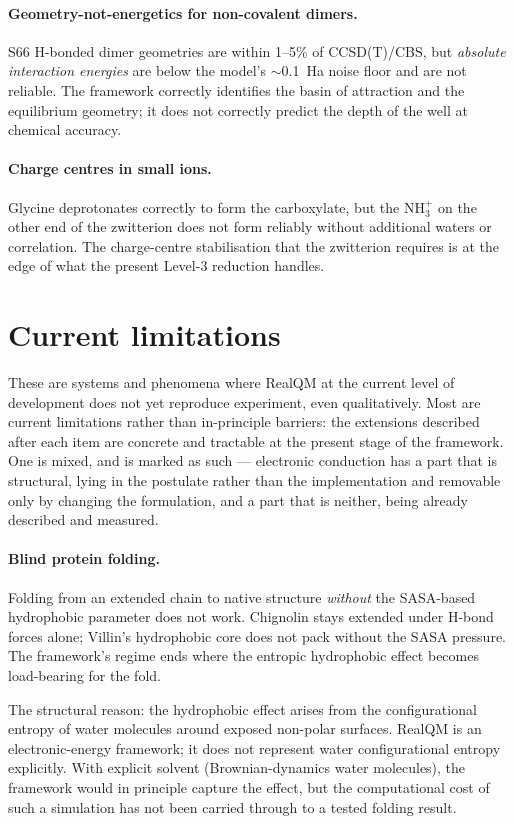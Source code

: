 \paragraph{Geometry-not-energetics for non-covalent dimers.}
S66 H-bonded dimer geometries are within 1--5\% of CCSD(T)/CBS, but \emph{absolute interaction energies} are below the model's $\sim$0.1~Ha noise floor and are not reliable. The framework correctly identifies the basin of attraction and the equilibrium geometry; it does not correctly predict the depth of the well at chemical accuracy.

\paragraph{Charge centres in small ions.}
Glycine deprotonates correctly to form the carboxylate, but the NH$_3^+$ on the other end of the zwitterion does not form reliably without additional waters or correlation. The charge-centre stabilisation that the zwitterion requires is at the edge of what the present Level-3 reduction handles.

\section{Current limitations}\label{sec:current-limitations}

These are systems and phenomena where RealQM at the current level of development does not yet reproduce experiment, even qualitatively. Most are current limitations rather than in-principle barriers: the extensions described after each item are concrete and tractable at the present stage of the framework. One is mixed, and is marked as such --- electronic conduction has a part that is structural, lying in the postulate rather than the implementation and removable only by changing the formulation, and a part that is neither, being already described and measured.

\paragraph{Blind protein folding.}
Folding from an extended chain to native structure \emph{without} the SASA-based hydrophobic parameter does not work. Chignolin stays extended under H-bond forces alone; Villin's hydrophobic core does not pack without the SASA pressure. The framework's regime ends where the entropic hydrophobic effect becomes load-bearing for the fold.

The structural reason: the hydrophobic effect arises from the configurational entropy of water molecules around exposed non-polar surfaces. RealQM is an electronic-energy framework; it does not represent water configurational entropy explicitly. With explicit solvent (Brownian-dynamics water molecules), the framework would in principle capture the effect, but the computational cost of such a simulation has not been carried through to a tested folding result.

